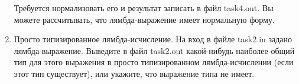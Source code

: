 \documentclass[12pt,a4paper,oneside]{article}
\begin{document}
\begin{enumerate}
Требуется нормализовать его и результат записать в файл task4.out. 
Вы можете рассчитывать, что лямбда-выражение имеет нормальную форму.

%

%

\item Просто типизированное лямбда-исчисление. На вход в файле task2.in задано лямбда-выражение.
Выведите в файл task2.out какой-нибудь наиболее общий тип для этого выражения в просто типизированном 
лямбда-исчислении (если этот тип существует), или укажите, что выражение типа не имеет.


\end{enumerate}
\end{document}
